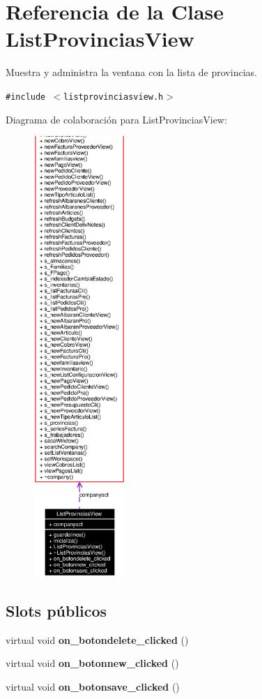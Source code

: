 \section{Referencia de la Clase List\-Provincias\-View}
\label{classListProvinciasView}
Muestra y administra la ventana con la lista de provincias.  


{\tt \#include $<$listprovinciasview.h$>$}

Diagrama de colaboraci\'{o}n para List\-Provincias\-View:\begin{figure}[H]
\begin{center}
\leavevmode
\includegraphics[width=99pt]{classListProvinciasView__coll__graph}
\end{center}
\end{figure}
\subsection*{Slots p\'{u}blicos}
\begin{CompactItemize}
\item 
virtual void {\bf on\_\-botondelete\_\-clicked} ()\label{classListProvinciasView_i0}

\item 
virtual void {\bf on\_\-botonnew\_\-clicked} ()\label{classListProvinciasView_i1}

\item 
virtual void {\bf on\_\-botonsave\_\-clicked} ()\label{classListProvinciasView_i2}

\end{CompactItemize}
